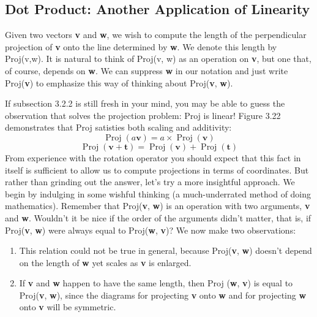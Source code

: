 \documentclass{book}
\begin{document}
\subsection{Dot Product: Another Application of Linearity}

Given two vectors \textbf{v} and \textbf{w}, we wish to compute the length of the
perpendicular projection of \textbf{v} onto the line determined by \textbf{w}. We denote
this length by Proj(v,w). It is natural to think of Proj(v, w) as an
operation on \textbf{v}, but one that, of course, depends on \textbf{w}. We can suppress \textbf{w}
in our notation and just write Proj(\textbf{v}) to emphasize this way of thinking
about Proj(\textbf{v}, \textbf{w}).

If subsection 3.2.2 is still fresh in your mind, you may be able to guess
the observation that solves the projection problem: Proj is linear! Figure
3.22 demonstrates that Proj satisties both scaling and additivity:
$$\operatorname{Proj}(a\mathbf{v}) = a \times \operatorname{Proj}(\mathbf{v})$$
$$\operatorname{Proj}(\mathbf{v} + \mathbf{t}) = \operatorname{Proj}(\mathbf{v}) + \operatorname{Proj}(\mathbf{t})$$ 
 From experience with the rotation operator you should expect that this
fact in itself is sufficient to allow us to compute projections in terms of
coordinates. But rather than grinding out the answer, let's try a more
insightful approach. We begin by indulging in some wishful thinking
(a much-underrated method of doing mathematics). Remember that
Proj(\textbf{v}, \textbf{w}) is an operation with two arguments, \textbf{v} and \textbf{w}. Wouldn't it be
nice if the order of the arguments didn't matter, that is, if Proj(\textbf{v}, \textbf{w})
were always equal to Proj(\textbf{w}, \textbf{v})? We now make two observations:

\begin{enumerate}
\item This relation could not be true in general, because Proj(\textbf{v}, \textbf{w}) doesn't
depend on the length of \textbf{w} yet scales as \textbf{v} is enlarged.
\item If \textbf{v} and \textbf{w} happen to have the same length, then Proj (\textbf{w}, \textbf{v}) is equal to
Proj(\textbf{v}, \textbf{w}), since the diagrams for projecting \textbf{v} onto \textbf{w} and for projecting
\textbf{w} onto \textbf{v} will be symmetric.
\end{enumerate}
\end{document}
